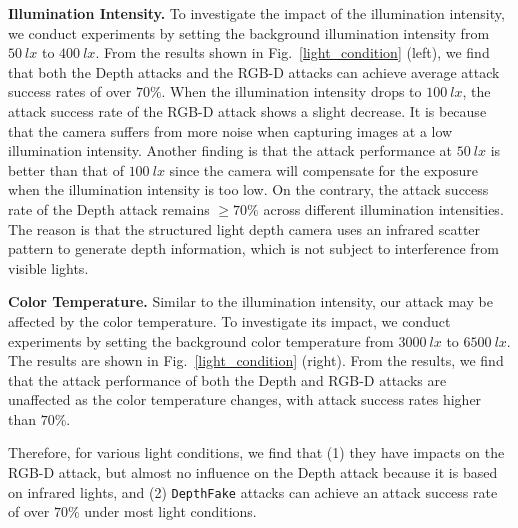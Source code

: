 \textbf{Illumination Intensity.} To investigate the impact of the illumination intensity, we conduct  experiments by setting the background illumination intensity from $50~lx$ to $400~lx$.
From the results shown in Fig.~\ref{light_condition} (left), we find that both the Depth attacks and the RGB-D attacks can achieve average attack success rates of over $70\%$.
When the illumination intensity drops to $100~lx$, the attack success rate of the RGB-D attack shows a slight decrease. 
It is because  that the camera suffers from more noise when capturing images at a low illumination intensity. Another finding is that the attack performance at $50~lx$ is better than that of $100~lx$ since the camera will compensate for the exposure when the illumination intensity is too low.
On the contrary, the attack success rate of the Depth attack remains $\geq$$70\%$ across different illumination intensities. The reason is that the structured light depth camera uses an infrared scatter pattern to generate depth information, which is not subject to interference from visible lights.


\textbf{Color Temperature.} Similar to the illumination intensity, our attack may be affected by the color temperature. To investigate its impact, we conduct experiments by setting the background color temperature from $3000~lx$ to $6500~lx$.
The results are shown in Fig.~\ref{light_condition} (right). From the results, we find that the attack performance of both the Depth and RGB-D  attacks are unaffected as the color temperature changes, with attack success rates higher than $70\%$.

Therefore, for various light conditions, we find that (1) they have impacts on the RGB-D attack, but almost no influence on the Depth attack because it is based on infrared lights, and (2) \texttt{DepthFake} attacks can achieve an attack success rate of over $70\%$ under most light conditions.

